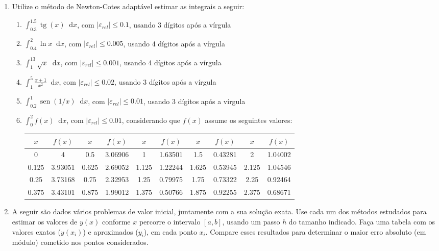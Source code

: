 \documentclass[12pt,a4paper]{article}
\newcommand*\sen{\operatorname{sen}}
\newcommand*\tg{\operatorname{tg}}
\newcommand*\diff{\mathop{}\!\mathrm{d}}
\begin{document}
\begin{enumerate}
\item Utilize o método de Newton-Cotes adaptável estimar as integrais a seguir:
\begin{enumerate}
\item $\int_{0.3}^{1.5} \tg(x)\diff{x}$, com $|\varepsilon_{rel}| \leq 0.1$, usando 3 dígitos após a vírgula
\item $\int_{0.4}^{2} \ln{x}\diff{x}$, com $|\varepsilon_{rel}| \leq 0.005$, usando 4 dígitos após a vírgula
\item $\int_{1}^{13} \sqrt{x}\diff{x}$, com $|\varepsilon_{rel}| \leq 0.001$, usando 4 dígitos após a vírgula
\item $\int_1^5 \frac{x+1}{x^2}\diff{x}$, com $|\varepsilon_{rel}| \leq 0.02$, usando 3 dígitos após a vírgula
\item $\int_{0.2}^{1} \sen(1/x)\diff{x}$, com $|\varepsilon_{rel}| \leq 0.01$, usando 3 dígitos após a vírgula
\item $\int_{0}^{2} f(x)\diff{x}$, com $|\varepsilon_{rel}| \leq 0.01$, considerando que $f(x)$ assume os seguintes valores:
\begin{center}\hspace{-1cm}
\begin{tabular}{|c|c||c|c||c|c||c|c||c|c|}
\hline
$x$ & $f(x)$ & $x$ & $f(x)$ & $x$ & $f(x)$ & $x$ & $f(x)$ & $x$ & $f(x)$\\
\hline
0 & 4 & 0.5 & 3.06906 & 1 & 1.63501 & 1.5 & 0.43281 & 2 & 1.04002\\
\hline
0.125 & 3.93051 & 0.625 & 2.69052 & 1.125 & 1.22244 & 1.625 & 0.53945 & 2.125 & 1.04546\\
\hline
0.25 & 3.73168 & 0.75 & 2.32953 & 1.25 & 0.79975 & 1.75 & 0.73322 & 2.25 & 0.92464\\
\hline
0.375 & 3.43101 & 0.875 & 1.99012 & 1.375 & 0.50766 & 1.875 & 0.92255 & 2.375 & 0.68671\\
\hline
\end{tabular}
\end{center}
\end{enumerate}
\item A seguir são dados vários problemas de valor inicial, juntamente com a sua solução exata. Use cada um dos métodos estudados para estimar os valores de $y(x)$ conforme $x$ percorre o intervalo $[a,b]$, usando um passo $h$ do tamanho indicado. Faça uma tabela com os valores exatos ($y(x_i)$) e aproximados ($y_i$), em cada ponto $x_i$. Compare esses resultados para determinar o maior erro absoluto (em módulo) cometido nos pontos considerados.

\end{enumerate}
\end{document}

